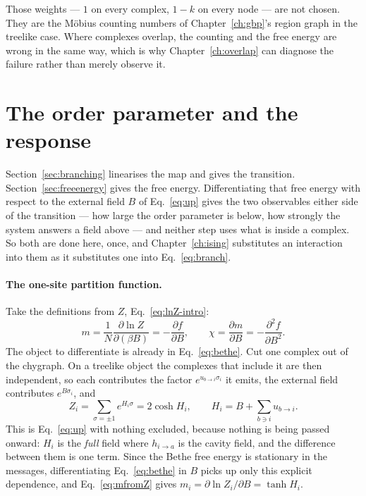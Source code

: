 Those weights --- $1$ on every complex, $1-k$ on every node --- are not chosen.
They are the M\"obius counting numbers of Chapter~\ref{ch:gbp}'s region graph in
the treelike case. Where complexes overlap, the counting and the free energy are
wrong in the same way, which is why Chapter~\ref{ch:overlap} can diagnose the
failure rather than merely observe it.

\section{The order parameter and the response}
\label{sec:response}

Section~\ref{sec:branching} linearises the map and gives the transition.
Section~\ref{sec:freeenergy} gives the free energy. Differentiating that free
energy with respect to the external field $B$ of Eq.~\eqref{eq:up} gives the
two observables either side of the transition --- how large the order parameter
is below, how strongly the system answers a field above --- and neither step
uses what is inside a complex. So both are done here, once, and
Chapter~\ref{ch:ising} substitutes an interaction into them as it substitutes
one into Eq.~\eqref{eq:branch}.

\paragraph{The one-site partition function.} Take the definitions from $Z$,
Eq.~\eqref{eq:lnZ-intro}:
\begin{equation}
  m=\frac{1}{N}\frac{\partial\ln Z}{\partial(\beta B)}
   =-\frac{\partial f}{\partial B},
  \qquad
  \chi=\frac{\partial m}{\partial B}
      =-\frac{\partial^{2}f}{\partial B^{2}}.
  \label{eq:mfromZ}
\end{equation}
The object to differentiate is already in Eq.~\eqref{eq:bethe}. Cut one complex
out of the chygraph. On a treelike object the complexes that include it are
then independent, so each contributes the factor $e^{u_{b\to i}\sigma_{i}}$ it
emits, the external field contributes $e^{B\sigma_{i}}$, and
\begin{equation}
  Z_{i}=\sum_{\sigma=\pm1}e^{H_{i}\sigma}=2\cosh H_{i},
  \qquad
  H_{i}=B+\sum_{b\ni i}u_{b\to i}.
  \label{eq:Zi}
\end{equation}
This is Eq.~\eqref{eq:up} with nothing excluded, because nothing is being
passed onward: $H_{i}$ is the \emph{full} field where $h_{i\to a}$ is the cavity
field, and the difference between them is one term. Since the Bethe free energy
is stationary in the messages, differentiating Eq.~\eqref{eq:bethe} in $B$
picks up only this explicit dependence, and Eq.~\eqref{eq:mfromZ} gives
$m_{i}=\partial\ln Z_{i}/\partial B=\tanh H_{i}$.

